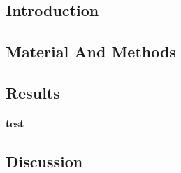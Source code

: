 \subsection*{Introduction}

\lipsum[1-3]

\subsection*{Material And Methods}

\lipsum

\subsection*{Results}

\paragraph{test}

\lipsum[3]

\subsection*{Discussion}

\lipsum[4]
